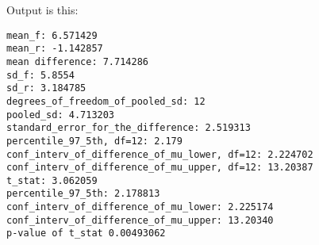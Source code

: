 \documentclass[a4paper,10pt]{article}
\begin{document}
Output is this:
\begin{verbatim}
mean_f: 6.571429
mean_r: -1.142857
mean difference: 7.714286
sd_f: 5.8554
sd_r: 3.184785
degrees_of_freedom_of_pooled_sd: 12
pooled_sd: 4.713203
standard_error_for_the_difference: 2.519313
percentile_97_5th, df=12: 2.179
conf_interv_of_difference_of_mu_lower, df=12: 2.224702
conf_interv_of_difference_of_mu_upper, df=12: 13.20387
t_stat: 3.062059
percentile_97_5th: 2.178813
conf_interv_of_difference_of_mu_lower: 2.225174
conf_interv_of_difference_of_mu_upper: 13.20340
p-value of t_stat 0.00493062
\end{verbatim}
\end{document}
